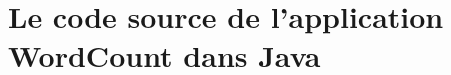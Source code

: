 \chapter{Le code source de l'application WordCount dans Java}
\label{sourceCodeWordCountJava.ann}



\newpage
